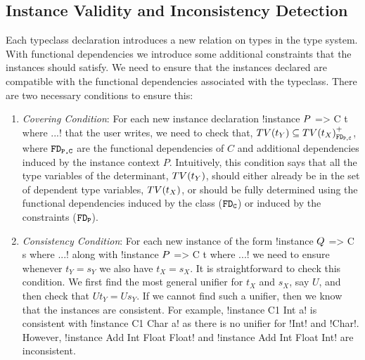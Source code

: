 \documentclass[format=acmsmall,manuscript,review,screen,nonacm,margin=1in,11pt]{acmart}
\begin{document}
\subsection{Instance Validity and Inconsistency Detection}
Each typeclass declaration introduces a new relation on types in the type system. With functional dependencies
we introduce some additional constraints that the instances should satisfy.
We need to ensure that the instances declared are compatible
with the functional dependencies associated with the typeclass.
There are two necessary conditions to ensure this:
\begin{enumerate}[topsep={0pt},partopsep={0pt}]
\item\emph{Covering Condition}:  For each new instance declaration !instance $P$ => C t where ...!
  that the user writes, we need to check that,%
  $TV(t_Y) \subseteq {TV(t_X)}^{+}_{\texttt{FD}_\texttt{{P,C}}}$,
  where $\texttt{FD}_\texttt{{P,C}}$ are the functional dependencies of $C$ and additional dependencies
  induced by the instance context $P$. Intuitively, this condition says that
  all the type variables of the determinant, $TV(t_Y)$, should either already be in the
  set of dependent type variables, $TV(t_X)$, or should be fully determined using the
  functional dependencies induced by the class ($\texttt{FD}_\texttt{C}$) or induced by the constraints ($\texttt{FD}_\texttt{P}$).
\item\emph{Consistency Condition}: For each new instance of the form !instance $Q$ => C s where ...!
  along with !instance $P$ => C t where ...! we need to ensure whenever $t_Y = s_Y$ we also have $t_X = s_X$.
  It is straightforward to check this condition. We first find the most general unifier for $t_X$ and $s_X$,
  say $U$, and then check that $U t_Y = U s_Y$. If we cannot find such a unifier, then we know that
  the instances are consistent. For example, !instance C1 Int a! is consistent with !instance C1 Char a!
  as there is no unifier for !Int! and !Char!. However, !instance Add Int Float Float!
  and !instance Add Int Float Int! are inconsistent.%
\end{enumerate}
\end{document}
